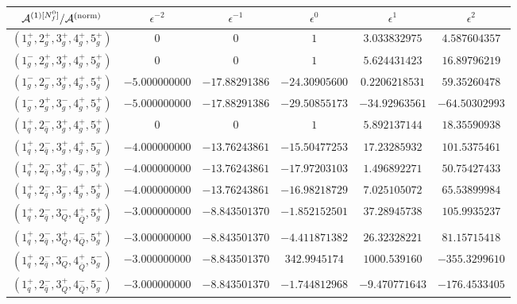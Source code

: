 \begin{table}[h]
  \centering
  \begin{adjustbox}{width=1\textwidth}
    \begin{tabular}{cccccc}
      \toprule
      $\mathcal{A}^{(1)[N_f^0]}/\mathcal{A}^\mathrm{(norm)}$   &   $\epsilon^{-2}$   &   $\epsilon^{-1}$   &   $\epsilon^{0}$   &   $\epsilon^{1}$  &  $\epsilon^{2}$ \\
      \midrule
      $(1_g^+,2_g^+,3_g^+,4_g^+,5_g^+)$ & $0$ & $0$ & $1$ &
      $3.033832975$ & $4.587604357$ \\
      $(1_g^-,2_g^+,3_g^+,4_g^+,5_g^+)$ & $0$ & $0$ & $1$ &
      $5.624431423$ & $16.89796219$ \\
      $(1_g^-,2_g^-,3_g^+,4_g^+,5_g^+)$ &  $-5.000000000$ &
      $-17.88291386$ & $-24.30905600$ & $0.2206218531$ &
      $59.35260478$ \\
      $(1_g^-,2_g^+,3_g^-,4_g^+,5_g^+)$ &  $-5.000000000$ &
      $-17.88291386$ & $-29.50855173$ & $-34.92963561$ &
      $-64.50302993$ \\
      \midrule
      $(1_q^+,2_{\bar q}^-,3_g^+,4_g^+,5_g^+)$ & $0$ & $0$ & $1$ &
      $5.892137144$ & $18.35590938$ \\
      $(1_q^+,2_{\bar q}^-,3_g^+,4_g^+,5_g^-)$ & $-4.000000000$ &
      $-13.76243861$ & $-15.50477253$ & $17.23285932$ &
      $101.5375461$ \\
      $(1_q^+,2_{\bar q}^-,3_g^+,4_g^-,5_g^+)$ & $-4.000000000$ &
      $-13.76243861$ & $-17.97203103$ & $1.496892271$ &
      $50.75427433$ \\
      $(1_q^+,2_{\bar q}^-,3_g^-,4_g^+,5_g^+)$ & $-4.000000000$ &
      $-13.76243861$ & $-16.98218729$ & $7.025105072$ &
      $65.53899984$ \\
      \midrule
      $(1_q^+,2_{\bar q}^-,3_Q^-,4_{\bar Q}^+,5_g^+)$ &
      $-3.000000000$& $-8.843501370$ & $-1.852152501$ &
      $37.28945738$
      & $105.9935237$ \\
      $(1_q^+,2_{\bar q}^-,3_Q^+,4_{\bar Q}^-,5_g^+)$ &
      $-3.000000000$& $-8.843501370$ & $-4.411871382$ &
      $26.32328221$ & $81.15715418$ \\
      $(1_q^+,2_{\bar q}^-,3_Q^-,4_{\bar Q}^+,5_g^-)$ &
      $-3.000000000$& $-8.843501370$ & $342.9945174$ &
      $1000.539160$ & $-355.3299610$ \\
      $(1_q^+,2_{\bar q}^-,3_Q^+,4_{\bar Q}^-,5_g^-)$ &
      $-3.000000000$&
      $-8.843501370$ & $-1.744812968$ & $-9.470771643$ &
      $-176.4533405$ \\
      \toprule

\end{tabular}
\end{adjustbox}
\end{table}
